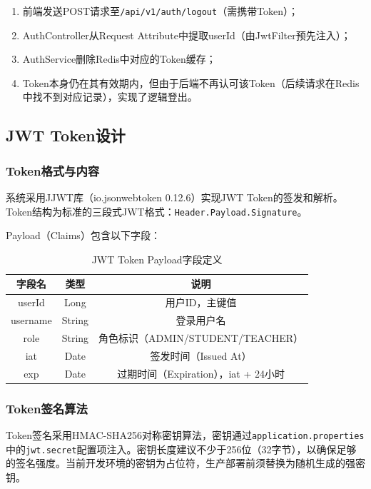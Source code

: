 \documentclass{../softeng}
\begin{document}
\begin{enumerate}
    \item 前端发送POST请求至\verb|/api/v1/auth/logout|（需携带Token）；
    \item AuthController从Request Attribute中提取userId（由JwtFilter预先注入）；
    \item AuthService删除Redis中对应的Token缓存；
    \item Token本身仍在其有效期内，但由于后端不再认可该Token（后续请求在Redis中找不到对应记录），实现了逻辑登出。
\end{enumerate}

\subsection{JWT Token设计}

\subsubsection{Token格式与内容}

系统采用JJWT库（io.jsonwebtoken 0.12.6）实现JWT Token的签发和解析。Token结构为标准的三段式JWT格式：\verb|Header.Payload.Signature|。

Payload（Claims）包含以下字段：

\begin{table}[htbp]
    \centering
    \caption{JWT Token Payload字段定义}
    \begin{tabular}{|c|c|c|}
        \hline
        \textbf{字段名} & \textbf{类型} & \textbf{说明} \\
        \hline
        userId & Long & 用户ID，主键值 \\
        \hline
        username & String & 登录用户名 \\
        \hline
        role & String & 角色标识（ADMIN/STUDENT/TEACHER） \\
        \hline
        iat & Date & 签发时间（Issued At） \\
        \hline
        exp & Date & 过期时间（Expiration），iat + 24小时 \\
        \hline
    \end{tabular}
\end{table}

\subsubsection{Token签名算法}

Token签名采用HMAC-SHA256对称密钥算法，密钥通过\verb|application.properties|中的\verb|jwt.secret|配置项注入。密钥长度建议不少于256位（32字节），以确保足够的签名强度。当前开发环境的密钥为占位符，生产部署前须替换为随机生成的强密钥。
\end{document}
